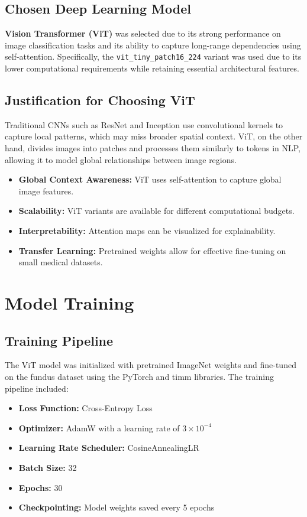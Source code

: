 \documentclass[a4paper,12pt]{report}
\begin{document}
\subsection{Chosen Deep Learning Model}

\textbf{Vision Transformer (ViT)} was selected due to its strong performance on image classification tasks and its ability to capture long-range dependencies using self-attention. Specifically, the \texttt{vit\_tiny\_patch16\_224} variant was used due to its lower computational requirements while retaining essential architectural features.

\subsection{Justification for Choosing ViT}

Traditional CNNs such as ResNet and Inception use convolutional kernels to capture local patterns, which may miss broader spatial context. ViT, on the other hand, divides images into patches and processes them similarly to tokens in NLP, allowing it to model global relationships between image regions.

\begin{itemize}
    \item \textbf{Global Context Awareness:} ViT uses self-attention to capture global image features.
    \item \textbf{Scalability:} ViT variants are available for different computational budgets.
    \item \textbf{Interpretability:} Attention maps can be visualized for explainability.
    \item \textbf{Transfer Learning:} Pretrained weights allow for effective fine-tuning on small medical datasets.
\end{itemize}

\section{Model Training}

\subsection{Training Pipeline}

The ViT model was initialized with pretrained ImageNet weights and fine-tuned on the fundus dataset using the PyTorch and timm libraries. The training pipeline included:

\begin{itemize}
    \item \textbf{Loss Function:} Cross-Entropy Loss
    \item \textbf{Optimizer:} AdamW with a learning rate of $3 \times 10^{-4}$
    \item \textbf{Learning Rate Scheduler:} CosineAnnealingLR
    \item \textbf{Batch Size:} 32
    \item \textbf{Epochs:} 30
    \item \textbf{Checkpointing:} Model weights saved every 5 epochs
\end{itemize}
\end{document}
